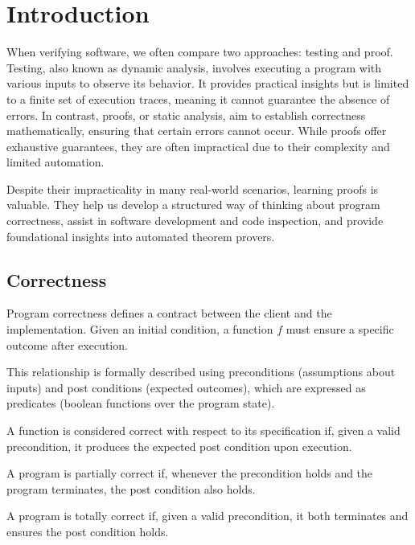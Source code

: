 \section{Introduction}

When verifying software, we often compare two approaches: testing and proof. 
Testing, also known as dynamic analysis, involves executing a program with various inputs to observe its behavior.
It provides practical insights but is limited to a finite set of execution traces, meaning it cannot guarantee the absence of errors. 
In contrast, proofs, or static analysis, aim to establish correctness mathematically, ensuring that certain errors cannot occur. 
While proofs offer exhaustive guarantees, they are often impractical due to their complexity and limited automation.

Despite their impracticality in many real-world scenarios, learning proofs is valuable. 
They help us develop a structured way of thinking about program correctness, assist in software development and code inspection, and provide foundational insights into automated theorem provers.

\subsection{Correctness}
Program correctness defines a contract between the client and the implementation.
Given an initial condition, a function $f$ must ensure a specific outcome after execution.

This relationship is formally described using preconditions (assumptions about inputs) and post conditions (expected outcomes), which are expressed as predicates (boolean functions over the program state).

\begin{definition}
    A function is considered correct with respect to its specification if, given a valid precondition, it produces the expected post condition upon execution.
\end{definition}

\begin{definition}
    A program is partially correct if, whenever the precondition holds and the program terminates, the post condition also holds.
\end{definition}

\begin{definition}
    A program is totally correct if, given a valid precondition, it both terminates and ensures the post condition holds.
\end{definition}